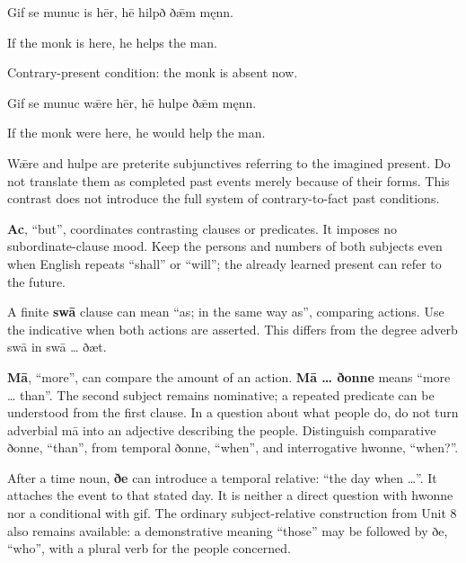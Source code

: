 Gif se munuc is hēr, hē hilpð ðǣm męnn.

If the monk is here, he helps the man.

Contrary-present condition: the monk is absent now.

Gif se munuc wǣre hēr, hē hulpe ðǣm męnn.

If the monk were here, he would help the man.

Wǣre and hulpe are preterite subjunctives referring to the imagined present. Do not translate them as completed past events merely because of their forms. This contrast does not introduce the full system of contrary-to-fact past conditions.

\textbf{Ac}, “but”, coordinates contrasting clauses or predicates. It imposes no subordinate-clause mood. Keep the persons and numbers of both subjects even when English repeats “shall” or “will”; the already learned present can refer to the future.

A finite \textbf{swā} clause can mean “as; in the same way as”, comparing actions. Use the indicative when both actions are asserted. This differs from the degree adverb swā in swā … ðæt.

\textbf{Mā}, “more”, can compare the amount of an action. \textbf{Mā … ðonne} means “more … than”. The second subject remains nominative; a repeated predicate can be understood from the first clause. In a question about what people do, do not turn adverbial mā into an adjective describing the people. Distinguish comparative ðonne, “than”, from temporal ðonne, “when”, and interrogative hwonne, “when?”.

After a time noun, \textbf{ðe} can introduce a temporal relative: “the day when …”. It attaches the event to that stated day. It is neither a direct question with hwonne nor a conditional with gif. The ordinary subject-relative construction from Unit 8 also remains available: a demonstrative meaning “those” may be followed by ðe, “who”, with a plural verb for the people concerned.

